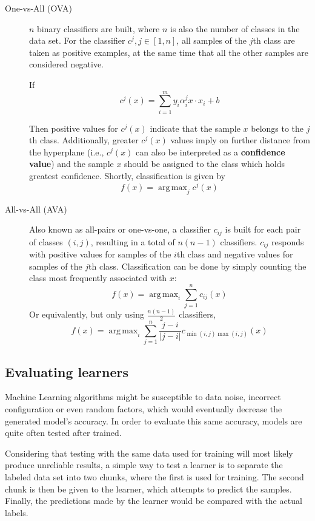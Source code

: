 \documentclass[12pt]{report}
\DeclareMathOperator*{\argmax}{arg\,max}
\begin{document}
\begin{description}
	\item[One-vs-All (OVA)] $n$ binary classifiers are built, where $n$ is also the number of classes in the data set. For the classifier $c^j, j \in [1, n]$, all samples of the $j$th class are taken as positive examples, at the same time that all the other samples are considered negative.

	If
	$$c^j(x) = \sum_{i=1}^{m} y_i \alpha_i^j x \cdot x_i + b$$

	Then positive values for $c^j(x)$ indicate that the sample $x$ belongs to the $j$th class. Additionally, greater $c^j(x)$ values imply on further distance from the hyperplane (i.e., $c^j(x)$ can also be interpreted as a \textbf{confidence value}) and the sample $x$ should be assigned to the class which holds greatest confidence. \cite{ovacj} Shortly, classification is given by
	$$ f(x) = \argmax_j{c^j(x)} $$
	\item[All-vs-All (AVA)] Also known as all-pairs or one-vs-one, a classifier $c_{ij}$ is built for each pair of classes $(i, j)$, resulting in a total of $n(n-1)$ classifiers. $c_{ij}$ responds with positive values for samples of the $i$th class and negative values for samples of the $j$th class. Classification can be done by simply counting the class most frequently associated with $x$:
	$$ f(x) = \argmax_i{\sum_{j=1}^{n} c_{ij}(x)} $$
	Or equivalently, but only using $\frac{n(n-1)}{2}$ classifiers,
	$$ f(x) = \argmax_i{\sum_{j=1}^{n} \frac{j-i}{|j-i|} c_{\min(i, j) \max(i, j)}(x)} $$
\end{description}

\subsection{Evaluating learners}

Machine Learning algorithms might be susceptible to data noise, incorrect configuration or even random factors, which would eventually decrease the generated model's accuracy. In order to evaluate this same accuracy, models are quite often tested after trained.

Considering that testing with the same data used for training will most likely produce unreliable results, a simple way to test a learner is to separate the labeled data set into two chunks, where the first is used for training. The second chunk is then be given to the learner, which attempts to predict the samples. Finally, the predictions made by the learner would be compared with the actual labels.
\end{document}
